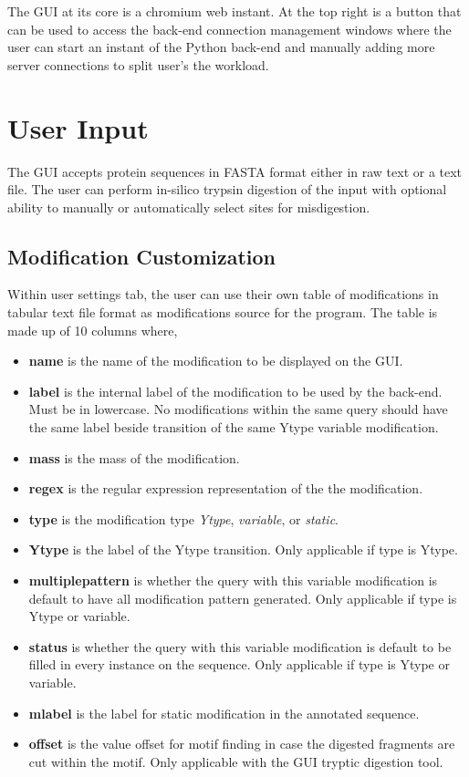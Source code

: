 \documentclass[../manual.tex]{subfiles}
\begin{document}
The GUI at its core is a chromium web instant. At the top right is a button that can be used to access the back-end connection management windows where the user can start an instant of the Python back-end and manually adding more server connections to split user's the workload.\par

\section{User Input}
The GUI accepts protein sequences in FASTA format either in raw text or a text file. The user can perform in-silico trypsin digestion of the input with optional ability to manually or automatically select sites for misdigestion.

\subsection{Modification Customization}
Within user settings tab, the user can use their own table of modifications in tabular text file format as modifications source for the program. The table is made up of 10 columns where,\par
\begin{itemize}
	\item \textbf{name} is the name of the modification to be displayed on the GUI.
	\item \textbf{label} is the internal label of the modification to be used by the back-end. Must be in lowercase. No modifications within the same query should have the same label beside transition of the same Ytype variable modification.
	\item \textbf{mass} is the mass of the modification.
	\item \textbf{regex} is the regular expression representation of the the modification.
	\item \textbf{type} is the modification type \emph{Ytype}, \emph{variable}, or \emph{static}.
	\item \textbf{Ytype} is the label of the Ytype transition. Only applicable if type is Ytype.
	\item \textbf{multiplepattern} is whether the query with this variable modification is default to have all modification pattern generated. Only applicable if type is Ytype or variable.
	\item \textbf{status} is whether the query with this variable modification is default to be filled in every instance on the sequence. Only applicable if type is Ytype or variable.
	\item \textbf{mlabel} is the label for static modification in the annotated sequence.
	\item \textbf{offset} is the value offset for motif finding in case the digested fragments are cut within the motif. Only applicable with the GUI tryptic digestion tool.
\end{itemize}
\end{document}
